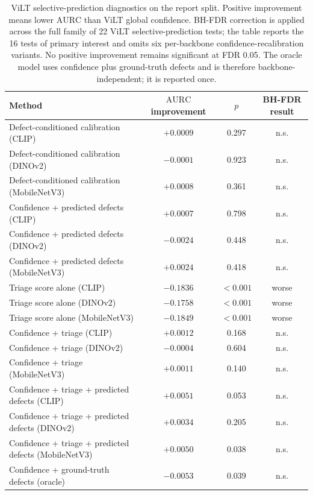 \documentclass{ieeeaccess}
\newcommand{\aurc}{\mathrm{AURC}}
\newcommand{\clip}{CLIP}
\newcommand{\dinov}{DINOv2}
\newcommand{\mobilenet}{MobileNetV3}
\newcommand{\vilt}{ViLT}
\begin{document}
\begin{table}[t]
    \centering
    \caption{\vilt{} selective-prediction diagnostics on the report split. Positive improvement means lower $\aurc$ than \vilt{} global confidence. BH-FDR correction is applied across the full family of 22 \vilt{} selective-prediction tests; the table reports the 16 tests of primary interest and omits six per-backbone confidence-recalibration variants. No positive improvement remains significant at FDR 0.05. The oracle model uses confidence plus ground-truth defects and is therefore backbone-independent; it is reported once.}
    \label{tab:selective}
    \small
    \begin{tabular}{lccc}
        \toprule
        Method & $\aurc$ improvement & $p$ & BH-FDR result \\
        \midrule
        Defect-conditioned calibration (\clip)      & $+0.0009$ & 0.297 & n.s. \\
        Defect-conditioned calibration (\dinov)     & $-0.0001$ & 0.923 & n.s. \\
        Defect-conditioned calibration (\mobilenet) & $+0.0008$ & 0.361 & n.s. \\
        \midrule
        Confidence + predicted defects (\clip)      & $+0.0007$ & 0.798 & n.s. \\
        Confidence + predicted defects (\dinov)     & $-0.0024$ & 0.448 & n.s. \\
        Confidence + predicted defects (\mobilenet) & $+0.0024$ & 0.418 & n.s. \\
        \midrule
        Triage score alone (\clip)      & $-0.1836$ & $<0.001$ & worse \\
        Triage score alone (\dinov)     & $-0.1758$ & $<0.001$ & worse \\
        Triage score alone (\mobilenet) & $-0.1849$ & $<0.001$ & worse \\
        \midrule
        Confidence + triage (\clip)      & $+0.0012$ & 0.168 & n.s. \\
        Confidence + triage (\dinov)     & $-0.0004$ & 0.604 & n.s. \\
        Confidence + triage (\mobilenet) & $+0.0011$ & 0.140 & n.s. \\
        \midrule
        Confidence + triage + predicted defects (\clip)      & $+0.0051$ & 0.053 & n.s. \\
        Confidence + triage + predicted defects (\dinov)     & $+0.0034$ & 0.205 & n.s. \\
        Confidence + triage + predicted defects (\mobilenet) & $+0.0050$ & 0.038 & n.s. \\
        \midrule
        Confidence + ground-truth defects (oracle) & $-0.0053$ & 0.039 & n.s. \\
        \bottomrule
    \end{tabular}
\end{table}
\end{document}

